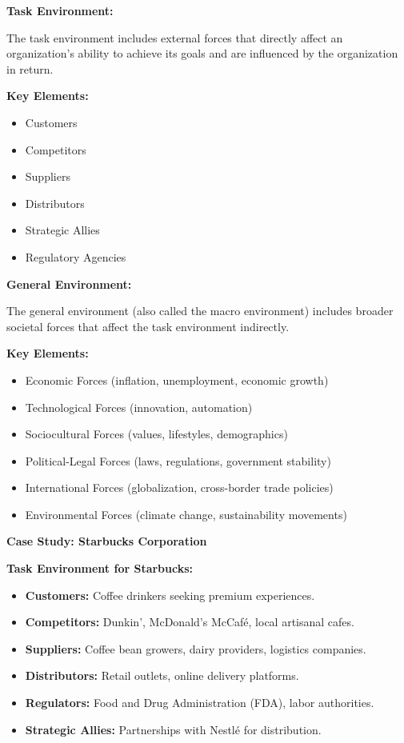 \documentclass[10pt,a4paper]{book}
\begin{document}
\begin{multicols}{2}
\textbf{Task Environment:}

The task environment includes external forces that directly affect an organization's ability to achieve its goals and are influenced by the organization in return.

\textbf{Key Elements:}
\begin{itemize}
    \item Customers
    \item Competitors
    \item Suppliers
    \item Distributors
    \item Strategic Allies
    \item Regulatory Agencies
\end{itemize}

\vspace{0.5cm}

\textbf{General Environment:}

The general environment (also called the macro environment) includes broader societal forces that affect the task environment indirectly.

\textbf{Key Elements:}
\begin{itemize}
    \item Economic Forces (inflation, unemployment, economic growth)
    \item Technological Forces (innovation, automation)
    \item Sociocultural Forces (values, lifestyles, demographics)
    \item Political-Legal Forces (laws, regulations, government stability)
    \item International Forces (globalization, cross-border trade policies)
    \item Environmental Forces (climate change, sustainability movements)
\end{itemize}

\vspace{0.8cm}

\textbf{Case Study: Starbucks Corporation}

\textbf{Task Environment for Starbucks:}
\begin{itemize}
    \item \textbf{Customers:} Coffee drinkers seeking premium experiences.
    \item \textbf{Competitors:} Dunkin', McDonald's McCafé, local artisanal cafes.
    \item \textbf{Suppliers:} Coffee bean growers, dairy providers, logistics companies.
    \item \textbf{Distributors:} Retail outlets, online delivery platforms.
    \item \textbf{Regulators:} Food and Drug Administration (FDA), labor authorities.
    \item \textbf{Strategic Allies:} Partnerships with Nestlé for distribution.
\end{itemize}


\end{multicols}
\end{document}
